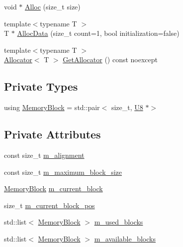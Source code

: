 \begin{DoxyCompactItemize}
\item 
void $\ast$ \mbox{\hyperlink{classmage_1_1_memory_arena_a2e63b11c535dbfefd69d071466be9ce1}{Alloc}} (size\+\_\+t size)
\item 
{\footnotesize template$<$typename T $>$ }\\T $\ast$ \mbox{\hyperlink{classmage_1_1_memory_arena_a0880de049e8e76cd26918528eb892813}{Alloc\+Data}} (size\+\_\+t count=1, bool initialization=false)
\item 
{\footnotesize template$<$typename T $>$ }\\\mbox{\hyperlink{classmage_1_1_memory_arena_1_1_allocator}{Allocator}}$<$ T $>$ \mbox{\hyperlink{classmage_1_1_memory_arena_aa2cc5c42ed20c11900330ace3dfcdc8f}{Get\+Allocator}} () const noexcept
\end{DoxyCompactItemize}
\subsection*{Private Types}
\begin{DoxyCompactItemize}
\item 
using \mbox{\hyperlink{classmage_1_1_memory_arena_a133e9d40bd216e3f1d98c6a2b36cf373}{Memory\+Block}} = std\+::pair$<$ size\+\_\+t, \mbox{\hyperlink{namespacemage_afc638980bc6154f15af5e2d93a0e0ea9}{U8}} $\ast$$>$
\end{DoxyCompactItemize}
\subsection*{Private Attributes}
\begin{DoxyCompactItemize}
\item 
const size\+\_\+t \mbox{\hyperlink{classmage_1_1_memory_arena_a424c3ff6f1d96545dd08f94c1c79c963}{m\+\_\+alignment}}
\item 
const size\+\_\+t \mbox{\hyperlink{classmage_1_1_memory_arena_aeef4c56cf50fd3cbbba2879fcd028b86}{m\+\_\+maximum\+\_\+block\+\_\+size}}
\item 
\mbox{\hyperlink{classmage_1_1_memory_arena_a133e9d40bd216e3f1d98c6a2b36cf373}{Memory\+Block}} \mbox{\hyperlink{classmage_1_1_memory_arena_a2680b25146c174ac7fd639f1bd0acc7c}{m\+\_\+current\+\_\+block}}
\item 
size\+\_\+t \mbox{\hyperlink{classmage_1_1_memory_arena_a880d07eb372ce1c8b907947fcbdfc59c}{m\+\_\+current\+\_\+block\+\_\+pos}}
\item 
std\+::list$<$ \mbox{\hyperlink{classmage_1_1_memory_arena_a133e9d40bd216e3f1d98c6a2b36cf373}{Memory\+Block}} $>$ \mbox{\hyperlink{classmage_1_1_memory_arena_a49a6d7fb9396f57210897abfb4e30903}{m\+\_\+used\+\_\+blocks}}
\item 
std\+::list$<$ \mbox{\hyperlink{classmage_1_1_memory_arena_a133e9d40bd216e3f1d98c6a2b36cf373}{Memory\+Block}} $>$ \mbox{\hyperlink{classmage_1_1_memory_arena_a02f251a5aafa61d239b4daed3458a654}{m\+\_\+available\+\_\+blocks}}
\end{DoxyCompactItemize}


